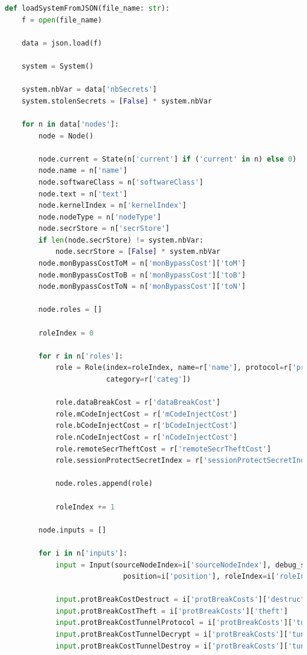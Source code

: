 \documentclass[a4paper]{article}
\begin{document}
\begin{appendices}
\begin{lstlisting}[language=python]
def loadSystemFromJSON(file_name: str):
    f = open(file_name)

    data = json.load(f)

    system = System()

    system.nbVar = data['nbSecrets']
    system.stolenSecrets = [False] * system.nbVar

    for n in data['nodes']:
        node = Node()

        node.current = State(n['current'] if ('current' in n) else 0)
        node.name = n['name']
        node.softwareClass = n['softwareClass']
        node.text = n['text']
        node.kernelIndex = n['kernelIndex']
        node.nodeType = n['nodeType']
        node.secrStore = n['secrStore']
        if len(node.secrStore) != system.nbVar:
            node.secrStore = [False] * system.nbVar
        node.monBypassCostToM = n['monBypassCost']['toM']
        node.monBypassCostToB = n['monBypassCost']['toB']
        node.monBypassCostToN = n['monBypassCost']['toN']

        node.roles = []

        roleIndex = 0
        
        for r in n['roles']:
            role = Role(index=roleIndex, name=r['name'], protocol=r['protocol'], roleType=r['type'],
                        category=r['categ'])

            role.dataBreakCost = r['dataBreakCost']
            role.mCodeInjectCost = r['mCodeInjectCost']
            role.bCodeInjectCost = r['bCodeInjectCost']
            role.nCodeInjectCost = r['nCodeInjectCost']
            role.remoteSecrTheftCost = r['remoteSecrTheftCost']
            role.sessionProtectSecretIndex = r['sessionProtectSecretIndex']

            node.roles.append(role)

            roleIndex += 1

        node.inputs = []

        for i in n['inputs']:
            input = Input(sourceNodeIndex=i['sourceNodeIndex'], debug_sourceNodeName=i['debug_sourceNodeName'],
                            position=i['position'], roleIndex=i['roleIndex'], isOpen=i['isOpen'])

            input.protBreakCostDestruct = i['protBreakCosts']['destruct']
            input.protBreakCostTheft = i['protBreakCosts']['theft']
            input.protBreakCostTunnelProtocol = i['protBreakCosts']['tunnelProtocol']
            input.protBreakCostTunnelDecrypt = i['protBreakCosts']['tunnelDecrypt']
            input.protBreakCostTunnelDestroy = i['protBreakCosts']['tunnelDestroy']


\end{lstlisting}
\end{appendices}
\end{document}
